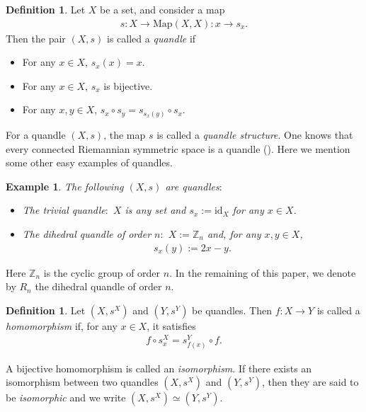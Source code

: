 \documentclass[12pt]{amsart}
\newtheorem{Ex}[Prop]{Example}
\theoremstyle{definition}
\newtheorem{Def}[Prop]{Definition}
\begin{document}
\begin{Def}\label{Def2.1}
Let $ X $ be a set, and consider a map
\begin{align*}
s: X \rightarrow {\mathrm{Map}}(X,X) : x \rightarrow s_{x}.
\end{align*}
Then the pair $ (X,s) $ is called a \textit{quandle} if
\begin{itemize}
\item[(Q1)]
For any $ x \in X $, $ s_{x}(x) = x $.
\item[(Q2)]
For any $ x \in X $, $ s_{x} $ is bijective.
\item[(Q3)]
For any $ x,y \in X $, $ s_{x} \circ s_{y} = s_{s_{x}(y)} \circ s_{x} $.
\end{itemize}
\end{Def}

For a quandle $ (X,s) $, the map $ s $ is called a \textit{quandle structure}. One knows that every connected Riemannian symmetric space is a quandle (\cite{Joyce}). Here we mention some other easy examples of quandles.

\begin{Ex}\label{Ex2.2}
The following $ (X,s) $ are quandles$:$
\begin{itemize}
\item[(1)]
The \textit{trivial quandle}$:$ $ X $ is any set and $ s_{x} := {\mathrm{id}}_{X} $ for any $ x \in X $.
\item[(2)]
The \textit{dihedral quandle of order $n$}$:$ $ X := {{\mathbb Z}}_{n} $ and, for any $ x,y \in X $,
\begin{align*}
s_{x}(y) := 2x-y.
\end{align*}
\end{itemize}
\end{Ex}

Here $ {{\mathbb Z}}_{n} $ is the cyclic group of order $ n $. In the remaining of this paper, we denote by $ R_{n} $ the dihedral quandle of order $ n $.

\begin{Def}\label{Def2.3}
Let $ (X,s^{X}) $ and $ (Y,s^{Y}) $ be quandles. Then $ f : X \rightarrow Y $ is called a \textit{homomorphism} if, for any $ x \in X $, it satisfies
\begin{align*}
f \circ s^{X}_{x} = s^{Y}_{f(x)} \circ f.
\end{align*}
\end{Def}

A bijective homomorphism is called an \textit{isomorphism}. If there exists an isomorphism between two quandles $ (X,s^{X}) $ and $ (Y,s^{Y}) $, then they are said to be \textit{isomorphic} and we write $ (X,s^{X}) \simeq (Y,s^{Y}) $.
\end{document}
